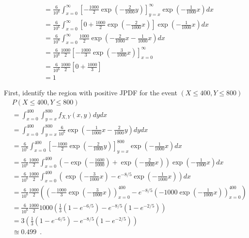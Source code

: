 \begin{example}
{\begin{align*}
&= \frac{6}{10^6} \int_{x=0}^{\infty} \left[ -\frac{1000}{2} \exp \left( -\frac{2}{1000}y \right) \right]_{y=x}^{\infty}  \exp \left(-\frac{1}{1000}x\right) dx\\
&= \frac{6}{10^6} \int_{x=0}^{\infty} \left[0 +\frac{1000}{2}\exp \left( -\frac{2}{1000}x \right) \right]  \exp \left(-\frac{1}{1000}x\right) dx\\
&= \frac{6}{10^6} \int_{x=0}^{\infty} \frac{1000}{2}\exp \left( -\frac{2}{1000}x -\frac{1}{1000}x\right) dx\\
&= \frac{6}{10^6} \frac{1000}{2} \left[ -\frac{1000}{3} \exp \left(-\frac{3}{1000}x\right)\right]_{x=0}^{\infty} \\
&= \frac{6}{10^6} \frac{1000}{2} \left[0 +\frac{1000}{3} \right] \\
&=1
\end{align*}
}
\item
First, identify the region with positive JPDF for the event $(X \leq 400, Y \leq 800)$
{\scriptsize
\begin{align*}
&P(X \leq 400, Y \leq 800)\\
&= \int_{x=0}^{400} \int_{y=x}^{800} f_{X,Y}(x,y) dy dx \\
&= \int_{x=0}^{400} \int_{y=x}^{800} \frac{6}{10^6} \exp \left( -\frac{1}{1000}x-\frac{2}{1000}y \right) dy dx \\
&= \frac{6}{10^6}  \int_{x=0}^{400} \left[ -\frac{1000}{2} \exp \left( -\frac{2}{1000}y \right) \right]_{y=x}^{800}  \exp \left(-\frac{1}{1000}x\right) dx\\
&= \frac{6}{10^6} \frac{1000}{2} \int_{x=0}^{400} \left( - \exp \left( -\frac{1600}{1000} \right) + \exp \left( -\frac{2}{1000}x \right) \right)  \exp \left(-\frac{1}{1000}x\right) dx\\
&= \frac{6}{10^6} \frac{1000}{2} \int_{x=0}^{400} \left( \exp \left( -\frac{3}{1000}x \right) - e^{-8/5} \exp \left(-\frac{1}{1000}x\right)\right) dx\\
&= \frac{6}{10^6} \frac{1000}{2} \left( \left( -\frac{1000}{3} \exp \left( -\frac{3}{1000}x \right) \right)_{x=0}^{400} - e^{-8/5} \left(-1000 \exp \left(-\frac{1}{1000}x\right)\right)_{x=0}^{400} \right) \\
&= \frac{6}{10^6} \frac{1000}{2} 1000 \left( \frac{1}{3}\left(1- e^{-6/5} \right) - e^{-8/5} \left( 1-e^{-2/5}\right) \right) \\
&= 3 \left( \frac{1}{3}\left(1- e^{-6/5} \right) - e^{-8/5} \left( 1-e^{-2/5}\right) \right) \\
&\approxeq 0.499 \enspace .
\end{align*}
}
\end{example}
